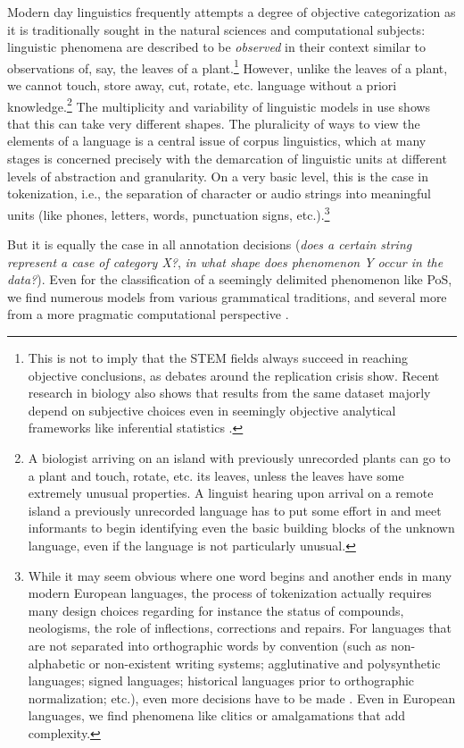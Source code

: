 \documentclass[output=paper,colorlinks,citecolor=brown]{langscibook}
\begin{document}
Modern day linguistics frequently attempts a degree of objective categorization as it is traditionally sought in the natural sciences and computational subjects: linguistic phenomena are described to be \textit{observed} in their context similar to observations of, say, the leaves of a plant.\footnote{This is not to imply that the STEM fields always succeed in reaching objective conclusions, as debates around the replication crisis show. Recent research in biology also shows that results from the same dataset majorly depend on subjective choices even in seemingly objective analytical frameworks like inferential statistics \parencite{gould2023same}.} However, unlike the leaves of a plant, we cannot touch, store away, cut, rotate, etc. language without a priori knowledge.\footnote{A biologist arriving on an island with previously unrecorded plants can go to a plant and touch, rotate, etc. its leaves, unless the leaves have some extremely unusual properties. A linguist hearing upon arrival on a remote island a previously unrecorded language has to put some effort in and meet informants to begin identifying even the basic building blocks of the unknown language, even if the language is not particularly unusual.} The multiplicity and variability of linguistic models in use shows that this can take very different shapes. The pluralicity of ways to view the elements of a language is a central issue of corpus linguistics, which at many stages is concerned precisely with the demarcation of linguistic units at different levels of abstraction and granularity. On a very basic level, this is the case in tokenization, i.e., the separation of character or audio strings into meaningful units (like phones, letters, words, punctuation signs, etc.).\footnote{While it may seem obvious where one word begins and another ends in many modern European languages, the process of tokenization actually requires many design choices regarding for instance the status of compounds, neologisms, the role of inflections, corrections and repairs. For languages that are not separated into orthographic words by convention (such as non-alphabetic or non-existent writing systems; agglutinative and polysynthetic languages; signed languages; historical languages prior to orthographic normalization; etc.), even more decisions have to be made \parencite{Bauer2000,Schmid2008}. Even in European languages, we find phenomena like clitics or amalgamations that add complexity.} 

But it is equally the case in all annotation decisions (\textit{does a certain string represent a case of category X?}, \textit{in what shape does phenomenon Y occur in the data?}). Even for the classification of a seemingly delimited phenomenon like PoS, we find numerous models from various grammatical traditions, and several more from a more pragmatic computational perspective \parencite[for a discussion see e.~g.][]{Robins1986,KnoblochSchaeder2000,Atwell2008,PETROV12.274}.
\end{document}

